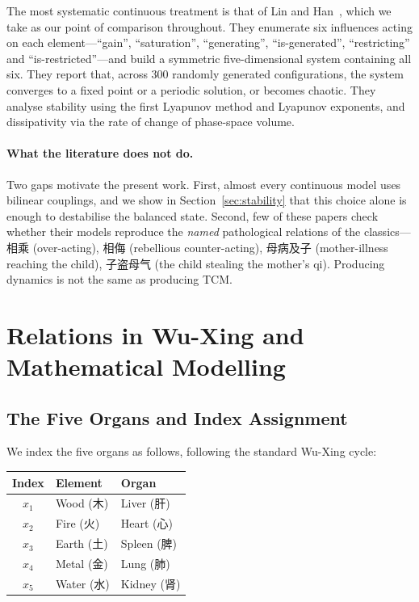 \documentclass[11pt]{article}
\begin{document}
The most systematic continuous treatment is that of Lin and
Han~\cite{Lin2020}, which we take as our point of comparison throughout. They
enumerate six influences acting on each element---``gain'', ``saturation'',
``generating'', ``is-generated'', ``restricting'' and ``is-restricted''---and
build a symmetric five-dimensional system containing all six. They report that,
across 300 randomly generated configurations, the system converges to a fixed
point or a periodic solution, or becomes chaotic. They analyse stability using
the first Lyapunov method and Lyapunov exponents, and dissipativity via the rate
of change of phase-space volume.

\paragraph{What the literature does not do.}
Two gaps motivate the present work. First, almost every continuous model uses
bilinear couplings, and we show in Section~\ref{sec:stability} that this choice
alone is enough to destabilise the balanced state. Second, few of these papers
check whether their models reproduce the \emph{named} pathological relations of
the classics---相乘 (over-acting), 相侮 (rebellious counter-acting), 母病及子
(mother-illness reaching the child), 子盗母气 (the child stealing the mother's
qi). Producing dynamics is not the same as producing TCM.

\section{Relations in Wu-Xing and Mathematical Modelling}\label{sec:relations}

\subsection{The Five Organs and Index Assignment}

We index the five organs as follows, following the standard Wu-Xing cycle:

\begin{center}
\begin{tabular}{cll}
\toprule
Index & Element & Organ \\
\midrule
$x_1$ & Wood\; (木) & Liver\; (肝) \\
$x_2$ & Fire\; (火)  & Heart\; (心) \\
$x_3$ & Earth\; (土) & Spleen\; (脾) \\
$x_4$ & Metal\; (金) & Lung\; (肺) \\
$x_5$ & Water\; (水) & Kidney\; (肾) \\
\bottomrule
\end{tabular}
\end{center}
\end{document}
